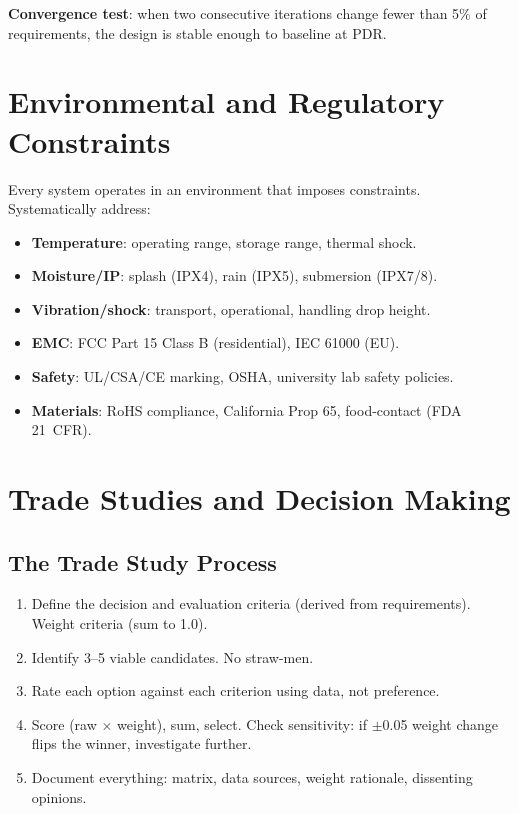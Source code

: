 \documentclass[11pt,letterpaper,twoside,openany]{book}
\begin{document}
\textbf{Convergence test}: when two consecutive iterations change fewer than 5\% of requirements, the design is stable enough to baseline at PDR.

\section{Environmental and Regulatory Constraints}
Every system operates in an environment that imposes constraints. Systematically address:
\begin{itemize}[nosep,leftmargin=1.5em]
\item \textbf{Temperature}: operating range, storage range, thermal shock.
\item \textbf{Moisture/IP}: splash (IPX4), rain (IPX5), submersion (IPX7/8).
\item \textbf{Vibration/shock}: transport, operational, handling drop height.
\item \textbf{EMC}: FCC Part 15 Class B (residential), IEC 61000 (EU).
\item \textbf{Safety}: UL/CSA/CE marking, OSHA, university lab safety policies.
\item \textbf{Materials}: RoHS compliance, California Prop 65, food-contact (FDA 21~CFR).
\end{itemize}

\section{Trade Studies and Decision Making}
\subsection{The Trade Study Process}
\begin{enumerate}[leftmargin=1.5em]
\item Define the decision and evaluation criteria (derived from requirements). Weight criteria (sum to 1.0).
\item Identify 3--5 viable candidates. No straw-men.
\item Rate each option against each criterion using data, not preference.
\item Score (raw $\times$ weight), sum, select. Check sensitivity: if $\pm$0.05 weight change flips the winner, investigate further.
\item Document everything: matrix, data sources, weight rationale, dissenting opinions.
\end{enumerate}
\end{document}
